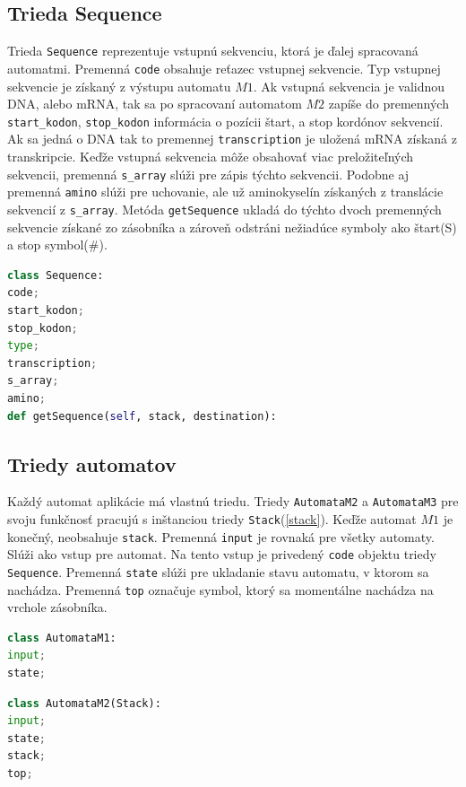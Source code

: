 \subsection{Trieda Sequence}
Trieda \texttt{Sequence} reprezentuje vstupnú sekvenciu, ktorá je ďalej spracovaná automatmi. Premenná \texttt{code} obsahuje reťazec vstupnej sekvencie. Typ vstupnej sekvencie je získaný z výstupu automatu $M1$. Ak vstupná sekvencia je validnou DNA, alebo mRNA, tak sa po spracovaní automatom $M2$ zapíše do premenných \texttt{start\_kodon}, \texttt{stop\_kodon} informácia o pozícii štart, a stop kordónov sekvencií. Ak sa jedná o DNA tak to premennej \texttt{transcription} je uložená mRNA získaná z transkripcie. Keďže vstupná sekvencia môže obsahovať viac preložiteľných sekvencii, premenná \texttt{s\_array} slúži pre zápis týchto sekvencii. Podobne aj premenná \texttt{amino} slúži pre uchovanie, ale už aminokyselín získaných z translácie sekvencií z \texttt{s\_array}. Metóda \texttt{getSequence} ukladá do týchto dvoch premenných sekvencie získané zo zásobníka a zároveň odstráni nežiadúce symboly ako štart(S) a stop symbol($\#$). 

\begin{lstlisting}[language=Python, caption=Metódy a premenné triedy \texttt{Sequence}]
class Sequence:
code;
start_kodon;
stop_kodon;
type;
transcription;
s_array;
amino;
def getSequence(self, stack, destination):
\end{lstlisting}

\subsection{Triedy automatov}
Každý automat aplikácie má vlastnú triedu. Triedy \texttt{AutomataM2} a \texttt{AutomataM3} pre svoju funkčnosť pracujú s inštanciou triedy \texttt{Stack}(\ref{stack}). Keďže automat $M1$ je konečný, neobsahuje \texttt{stack}. Premenná \texttt{input} je rovnaká pre všetky automaty. Slúži ako vstup pre automat. Na tento vstup je privedený \texttt{code} objektu triedy \texttt{Sequence}. Premenná \texttt{state} slúži pre ukladanie stavu automatu, v ktorom sa nachádza. Premenná \texttt{top} označuje symbol, ktorý sa momentálne nachádza na vrchole zásobníka. 
\begin{lstlisting}[language=Python, caption=Premenné triedy \texttt{AutomataM1}]
class AutomataM1:
input;
state;
\end{lstlisting}

\begin{lstlisting}[language=Python, caption=Premenné triedy \texttt{AutomataM2}]
class AutomataM2(Stack):
input;
state;
stack;
top;
\end{lstlisting}

